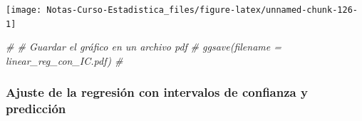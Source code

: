 \documentclass[
  12pt,
]{book}
\newenvironment{Shaded}{\begin{snugshade}}{\end{snugshade}}
\newcommand{\CommentTok}[1]{\textcolor[rgb]{0.56,0.35,0.01}{\textit{#1}}}
\begin{document}
\begin{center}\texttt{[image: Notas-Curso-Estadistica\_files/figure-latex/unnamed-chunk-126-1]} \end{center}

\begin{Shaded}
\begin{Highlighting}[]
\CommentTok{\# \# Guardar el gráfico en un archivo pdf}
\CommentTok{\# ggsave(filename = \textquotesingle{}linear\_reg\_con\_IC.pdf\textquotesingle{}) \# }
\end{Highlighting}
\end{Shaded}

\hypertarget{ajuste-de-la-regresiuxf3n-con-intervalos-de-confianza-y-predicciuxf3n}{%
\subsubsection{Ajuste de la regresión con intervalos de confianza y
predicción}\label{ajuste-de-la-regresiuxf3n-con-intervalos-de-confianza-y-predicciuxf3n}}
\end{document}
